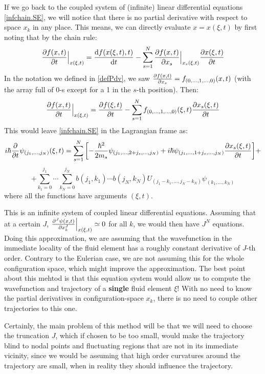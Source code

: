 \documentclass[11pt, a4paper]{article} %
\begin{document}
If we go back to the coupled system of (infinite) linear differential equations \eqref{infchain.SE}, we will notice that there is no partial derivative with respect to space $x_k$ in any place. This means, we can directly evaluate $x=x(\xi,t)$ by first noting that by the chain rule:
\begin{equation}
\pdv{f(x,t)}{t}\Big\rvert_{x(\xi,t)} = \dv{f(x(\xi,t),t)}{t}-\sum_{s=1}^N \pdv{f(x,t)}{x_s}\Big\rvert_{x_s(\xi,t)}\pdv{x(\xi,t)}{t}
\end{equation}
In the notation we defined in \eqref{defPdv}, we saw $\pdv{f(x,t)}{x_s}=f_{(0,...,1,...,0)}(x,t)$ (with the array full of 0-s except for a 1 in the $s$-th position). Then:
\begin{equation}\label{matrialTimePdv}
\pdv{f(x,t)}{t}\Big\rvert_{x(\xi,t)} = \pdv{f(\xi,t)}{t}-\sum_{s=1}^N f_{(0,...,1,...,0)}(\xi,t) \pdv{x_s(\xi,t)}{t}
\end{equation}
This would leave \eqref{infchain.SE} in the Lagrangian frame as:
\begin{equation}\label{infchain.SE}
i\hbar \pdv{}{t}\psi_{(j_1,...,j_N)}(\xi,t)=\sum_{s=1}^N\qty[-\frac{\hbar^2}{2m_s}\psi_{(j_1,...,2+j_s,...,j_N)}+i\hbar \psi_{(j_1,...,1+j_s,...,j_N)} \pdv{x_s(\xi,t)}{t}]+
\end{equation}
$$
+\sum_{k_1=0}^{j_1}\cdots\sum_{k_N=0}^{j_N} b(j_1,k_1)\cdots b(j_N,k_N)U_{(j_1-k_1,...,j_N-k_N)}\psi_{(k_1,...,k_N)}
$$
where all the functions have arguments $(\xi,t)$.

This is an infinite system of coupled linear differential equations. Assuming that at a certain $J$, $\pdv[J]{\psi(x,t)}{x_k}\Big\rvert_{x(\xi,t)}\simeq 0$ for all $k$, we would then have $J^N$ equations. Doing this approximation, we are assuming that the wavefunction in the immediate locality of the fluid element has a roughly constant derivative of $J$-th order. Contrary to the Eulerian case, we are not assuming this for the whole configuration space, which might improve the approximation. The best point about this mehtod is that this equation system would allow us to compute the wavefunction and trajectory of a {\bf single} fluid element $\xi$! With no need to know the partial derivatives in configuration-space $x_k$, there is no need to couple other trajectories to this one.

Certainly, the main problem of this method will be that we will need to choose the truncation $J$, which if chosen to be too small, would make the trajectory blind to nodal points and fluctuating regions that are not in its immediate vicinity, since we would be assuming that high order curvatures around the trajectory are small, when in reality they should influence the trajectory.
\end{document}
